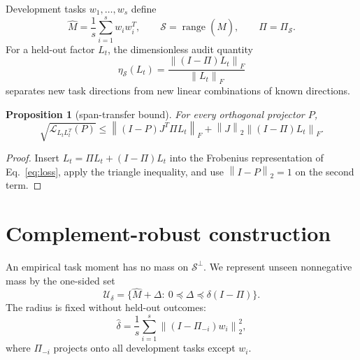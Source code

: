 \documentclass[10pt,letterpaper,twoside]{article}
\newtheorem{proposition}[theorem]{Proposition}
\newcommand{\I}{I}
\newcommand{\J}{J}
\newcommand{\M}{M}
\newcommand{\norm}[1]{\left\lVert #1\right\rVert}
\begin{document}
Development tasks $w_1,\ldots,w_s$ define
\begin{equation}
 \widehat\M=\frac1s\sum_{i=1}^s w_iw_i^T,\qquad
 \mathcal S=\operatorname{range}(\widehat\M),\qquad
 \Pi=\Pi_{\mathcal S}.                               \label{eq:source}
\end{equation}
For a held-out factor $L_t$, the dimensionless audit quantity
\begin{equation}
 \eta_{\mathcal S}(L_t)=
 \frac{\norm{(\I-\Pi)L_t}_F}{\norm{L_t}_F}           \label{eq:span}
\end{equation}
separates new task directions from new linear combinations of known
directions.

\begin{proposition}[span-transfer bound]
\label{prop:span}
For every orthogonal projector $P$,
\begin{equation}
 \sqrt{\mathcal L_{L_tL_t^T}(P)}
 \le\norm{(\I-P)\J^T\Pi L_t}_F
   +\norm{\J}_2\norm{(\I-\Pi)L_t}_F.                 \label{eq:spanbound}
\end{equation}
\end{proposition}

\begin{proof}
Insert $L_t=\Pi L_t+(\I-\Pi)L_t$ into the Frobenius representation of
Eq.~\eqref{eq:loss}, apply the triangle inequality, and use
$\norm{\I-P}_2=1$ on the second term.
\end{proof}

\section{Complement-robust construction}

An empirical task moment has no mass on $\mathcal S^\perp$.  We represent
unseen nonnegative mass by the one-sided set
\begin{equation}
 \mathcal U_\delta=
 \{\widehat\M+\Delta:\ 0\preceq\Delta
             \preceq\delta(\I-\Pi)\}.                \label{eq:set}
\end{equation}
The radius is fixed without held-out outcomes:
\begin{equation}
 \widehat\delta=\frac1s\sum_{i=1}^s
 \norm{(\I-\Pi_{-i})w_i}_2^2,                        \label{eq:radius}
\end{equation}
where $\Pi_{-i}$ projects onto all development tasks except $w_i$.
\end{document}
